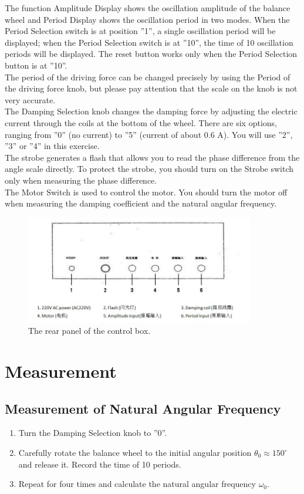 \documentclass{article}
\begin{document}
The function Amplitude Display shows the oscillation amplitude of the balance wheel and Period Display shows the oscillation period in two modes. When the Period Selection switch is at position ”1”, a single oscillation period will be displayed; when the Period Selection switch is at ”10”, the time of 10 oscillation periods will be displayed. The reset button works only when the Period Selection button is at ”10”.
\\

The period of the driving force can be changed precisely by using the Period of the driving force knob, but please pay attention that the scale on the knob is not very accurate.
\\

The Damping Selection knob changes the damping force by adjusting the electric current through the coils at the bottom of the wheel. There are six options, ranging from ”0” (no current) to ”5” (current of about 0.6 A). You will use ”2”, ”3” or ”4” in this exercise.
\\

The strobe generates a flash that allows you to read the phase difference from the angle scale directly. To protect the strobe, you should turn on the Strobe switch only when measuring the phase difference.
\\

The Motor Switch is used to control the motor. You should turn the motor off when measuring the damping coefficient and the natural angular frequency.

\begin{figure}[!h]
	\centering
	\includegraphics[width=10cm]{fig-4.png}
	\caption{The rear panel of the control box.
	\label{fig-4}}
\end{figure}

\section{Measurement}

\subsection{Measurement of Natural Angular Frequency}
\begin{enumerate}[(1)]
	\item
	Turn the Damping Selection knob to ”0”.
	\item
	Carefully rotate the balance wheel to the initial angular position $\theta_0\approx150^\circ$ and release it. Record the time of 10 periods.
	\item
	Repeat for four times and calculate the natural angular frequency $\omega_0$.
\end{enumerate}
\end{document}
